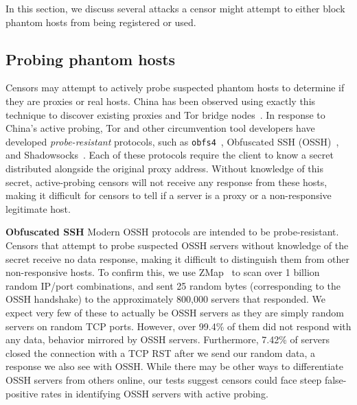 \documentclass[sigconf]{acmart}
\renewcommand{\paragraph}[1]{\smallskip\noindent\textbf{#1\quad}}
\begin{document}
In this section, we discuss several attacks a censor might attempt to either
block phantom hosts from being registered or used.


\subsection{Probing phantom hosts}
Censors may attempt to actively probe suspected phantom hosts to determine if
they are proxies or real hosts. China has been observed using exactly this technique to
discover existing proxies and Tor bridge
nodes~\cite{tor-bridge-blocking-blog,active-probe,ensafi-tor,china-blocking-tor}.
In response to China's active probing, Tor and other circumvention tool developers have developed
\emph{probe-resistant} protocols, such as \texttt{obfs4}~\cite{obfs4}, Obfuscated SSH
(OSSH)~\cite{ossh}, and Shadowsocks~\cite{shadowsocks}. Each of these protocols
require the client to know a secret distributed alongside the original
proxy address. Without knowledge of this secret, active-probing censors will not
receive any response from these hosts, making it difficult for censors to tell if
a server is a proxy or a non-responsive legitimate host.

\paragraph{Obfuscated SSH} Modern OSSH protocols are intended to be
probe-resistant. Censors that attempt to probe suspected OSSH servers without
knowledge of the secret receive no data response, making it difficult to
distinguish them from other non-responsive hosts. To confirm this, we use
ZMap~\cite{zmap13} to scan over 1 billion random IP/port combinations, and sent 25
random bytes (corresponding to the OSSH handshake) to the approximately 800,000
servers that responded. We expect very few of these to actually be OSSH
servers as they are simply random servers on random TCP ports.
However, over 99.4\% of them did not respond with any data, behavior mirrored by
OSSH servers.
Furthermore, 7.42\% of servers closed the connection with a TCP RST
after we send our random data, a response we also see with OSSH. While there may
be other ways to differentiate OSSH servers from others online, our tests
suggest censors could face steep false-positive rates in identifying OSSH
servers with active probing.

\FigIpEntropy
\end{document}
